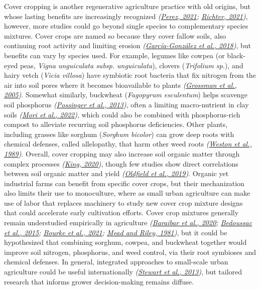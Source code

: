 \documentclass[
  12pt,
]{article}
\begin{document}
Cover cropping is another regenerative agriculture practice with old origins, but whose lasting benefits are increasingly recognized \emph{(\protect\hyperlink{ref-perez21}{Perez, 2021}; \protect\hyperlink{ref-richter21}{Richter, 2021})}, however, more studies could go beyond single species to complementary species mixtures.
Cover crops are named so because they cover fallow soils, also continuing root activity and limiting erosion \emph{(\protect\hyperlink{ref-garcia-gonzalez18}{García-González et al., 2018})}, but benefits can vary by species used.
For example, legumes like cowpea (or black-eyed peas, \emph{Vigna unguiculata subsp. unguiculata}), clovers (\emph{Trifolium sp.}), and hairy vetch (\emph{Vicia villosa}) have symbiotic root bacteria that fix nitrogen from the air into soil pores where it becomes bioavailable to plants \emph{(\protect\hyperlink{ref-grossman05}{Grossman et al., 2005})}.
Somewhat similarly, buckwheat (\emph{Fagopyrum esculentum}) helps scavenge soil phosphorus \emph{(\protect\hyperlink{ref-possinger13}{Possinger et al., 2013})}, often a limiting macro-nutrient in clay soils \emph{(\protect\hyperlink{ref-mori22}{Mori et al., 2022})}, which could also be combined with phosphorus-rich compost to alleviate recurring soil phosphorus deficiencies.
Other plants, including grasses like sorghum (\emph{Sorghum bicolor}) can grow deep roots with chemical defenses, called allelopathy, that harm other weed roots \emph{(\protect\hyperlink{ref-weston89}{Weston et al., 1989})}.
Overall, cover cropping may also increase soil organic matter through complex processes \emph{(\protect\hyperlink{ref-king20}{King, 2020})}, though few studies show direct correlations between soil organic matter and yield \emph{(\protect\hyperlink{ref-oldfield19}{Oldfield et al., 2019})}.
Organic yet industrial farms can benefit from specific cover crops, but their mechanization also limits their use to monoculture, where as small urban agriculture can make use of labor that replaces machinery to study new cover crop mixture designs that could accelerate early cultivation efforts.
Cover crop mixtures generally remain understudied empirically in agriculture \emph{(\protect\hyperlink{ref-baraibar20}{Baraibar et al., 2020}; \protect\hyperlink{ref-bedoussac15}{Bedoussac et al., 2015}; \protect\hyperlink{ref-bourke21}{Bourke et al., 2021}; \protect\hyperlink{ref-mead81}{Mead and Riley, 1981})}, but it could be hypothesized that combining sorghum, cowpea, and buckwheat together would improve soil nitrogen, phosphorus, and weed control, via their root symbioses and chemical defenses.
In general, integrated approaches to small-scale urban agriculture could be useful internationally \emph{(\protect\hyperlink{ref-stewart13}{Stewart et al., 2013})}, but tailored research that informs grower decision-making remains diffuse.
\end{document}
